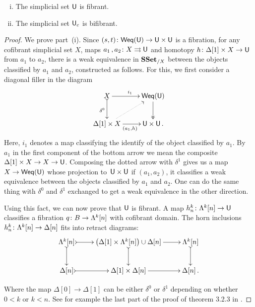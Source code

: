 \documentclass[reqno,10pt,a4paper,oneside,draft]{amsart}
\begin{document}
\begin{theorem} \label{thm:fibrancy-of-u-and-uc} \hfill 
\begin{enumerate}[(i)] 
\item The simplicial set $\mathsf{U}$ is fibrant. 
\item The simplicial set $\mathsf{U}_c$ is bifibrant. 
\end{enumerate}
\end{theorem}

\begin{proof} We prove part~(i). Since
$(s, t) \colon \mathsf{Weq}(\mathsf{U}) \rightarrow \mathsf{U} \times \mathsf{U}$ is a fibration, for any cofibrant 
simplicial set $X$,  maps $a_1 \, , a_2 \colon X \rightrightarrows \mathsf{U}$ and homotopy $h \colon \Delta[1] \times X \rightarrow \mathsf{U}$ from $a_1$ to $a_2$, there is a weak equivalence in $\mathbf{SSet}_{/X}$ between the objects classified by $a_1$ and $a_2$, constructed as follows. For this, we first consider a diagonal filler in the
diagram
\[
\xymatrix{ X \ar[r]^{i_1} \ar@{>->}[d]_{\delta^0} & \mathsf{Weq}(\U) \ar@{->>}[d] \\
\Delta[1] \times X \ar[r]_{(a_1,h)} \ar@{.>}[ur] & \U \times \U \, .
}
\]
Here, $i_1$ denotes a map classifying the identify of the object classified by $a_1$. By $a_1$ in the first component of the bottom arrow we mean the composite $\Delta[1] \times X \rightarrow X \rightarrow \mathsf{U}$. Composing the dotted arrow with $\delta^1$ gives us a map $X \rightarrow  \mathsf{Weq}(\mathsf{U})$ whose projection to~$\mathsf{U} \times \mathsf{U}$ if $(a_1,a_2)$, \ie it classifies a weak equivalence between the objects classified by $a_1$ and $a_2$. One can do the same thing with $\delta^0$ and $\delta^1$ exchanged to get a weak equivalence in the other direction.

Using this fact, we can now prove that $\mathsf{U}$ is fibrant. A map $h^k_n \colon \Lambda^k[n] \rightarrow \mathsf{U} $ classifies a fibration $q \colon B \rightarrow \Lambda^k[n]$ with cofibrant domain. The horn inclusions $h^k_n \colon \Lambda^k [n] \rightarrow \Delta[n]$ fits into retract diagrams:
\[
\xymatrix{\Lambda^k[n] \ar@{>->}[d] \ar@{>->}[r] & \big( \Delta[1] \times \Lambda^k[n] \big) \cup \Delta[n] \ar@{>->}[d] \ar[r] & \Lambda^k[n] \ar@{>->}[d]  \\
\Delta[n] \ar@{>->}[r] & \Delta[1] \times \Delta[n] \ar[r] & \Delta[n] \, .
}\]

Where the map $\Delta[0] \rightarrow \Delta[1]$ can be either $\delta^0$ or $\delta^1$ depending on whether $0<k$ or $k<n$. See for example the last part of the proof of theorem 3.2.3 in \cite{joyal-tierney:simplicial-homotopy-theory}.


\end{proof}
\end{document}
